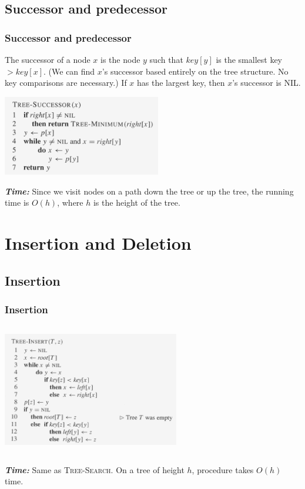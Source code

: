 \documentclass[notes,serif]{beamer}
\begin{document}
\subsection{Successor and predecessor}
\begin{frame}
\frametitle{Successor and predecessor}
  {\small The successor of a node $x$ is the node $y$ such that $key[y]$ is the smallest \mbox{key $ > key[x]$}.
  (We can find $x$'s successor based
entirely on the tree structure. No key comparisons are necessary.) If $x$ has the
largest key, then $x$'s successor is NIL.}
  \begin{block}{}
    \includegraphics[height=3.5cm]{12-tree_successor}
  \end{block}

  \begin{block}{}
  \small {\bf\em Time:} Since we visit nodes on a path down the tree or up the tree, the running
time is $O(h)$, where $h$ is the height of the tree.
  \end{block}
\end{frame}

\section{Insertion and Deletion}
\subsection{Insertion}
\begin{frame}
\frametitle{Insertion}
  \begin{columns}
  \begin{block}{}
    \includegraphics[height=5cm]{12-tree_insert}
  \end{block}
  \end{columns}

  \begin{columns}
  \begin{block}{}
    {\small {\bf\em Time:} Same as \textsc{Tree-Search}. On a tree of height $h$, procedure takes $O(h)$ time.}
  \end{block}
  \end{columns}
\end{frame}
\end{document}
